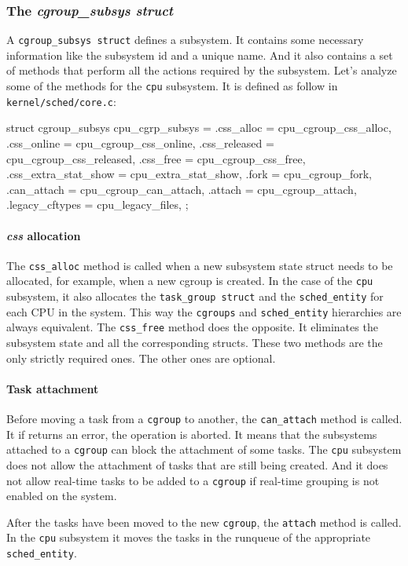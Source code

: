 \subsubsection{The \textit{cgroup\_subsys struct}}
A \verb|cgroup_subsys struct| defines a subsystem. It contains some necessary information like the subsystem id and a unique name. And it also contains a set of methods that perform all the actions required by the subsystem. Let's analyze some of the methods for the \verb|cpu| subsystem. It is defined as follow in \verb|kernel/sched/core.c|:
\begin{code}
struct cgroup_subsys cpu_cgrp_subsys = {
	.css_alloc	= cpu_cgroup_css_alloc,
	.css_online	= cpu_cgroup_css_online,
	.css_released	= cpu_cgroup_css_released,
	.css_free	= cpu_cgroup_css_free,
	.css_extra_stat_show = cpu_extra_stat_show,
	.fork		= cpu_cgroup_fork,
	.can_attach	= cpu_cgroup_can_attach,
	.attach		= cpu_cgroup_attach,
	.legacy_cftypes	= cpu_legacy_files,
};
\end{code}

\paragraph{\textit{css} allocation}
The \verb|css_alloc| method is called when a new subsystem state struct needs to be allocated, for example, when a new cgroup is created. In the case of the \verb|cpu| subsystem, it also allocates the \verb|task_group struct| and the \verb|sched_entity| for each CPU in the system. This way the \verb|cgroups| and \verb|sched_entity| hierarchies are always equivalent. The \verb|css_free| method does the opposite. It eliminates the subsystem state and all the corresponding structs. These two methods are the only strictly required ones. The other ones are optional.

\paragraph{Task attachment}
Before moving a task from a \verb|cgroup| to another, the \verb|can_attach| method is called. It if returns an error, the operation is aborted. It means that the subsystems attached to a \verb|cgroup| can block the attachment of some tasks. The \verb|cpu| subsystem does not allow the attachment of tasks that are still being created. And it does not allow real-time tasks to be added to a \verb|cgroup| if real-time grouping is not enabled on the system. 

After the tasks have been moved to the new \verb|cgroup|, the \verb|attach| method is called. In the \verb|cpu| subsystem it moves the tasks in the runqueue of the appropriate \verb|sched_entity|.

